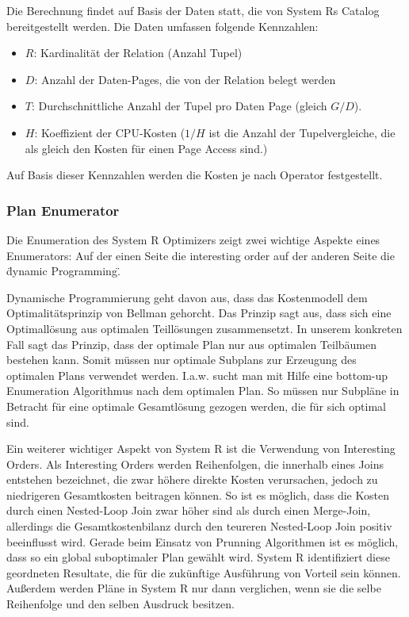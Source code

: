 Die Berechnung findet auf Basis der Daten statt, die von System Rs Catalog bereitgestellt werden. Die Daten umfassen folgende Kennzahlen:

\begin{itemize}
\item $R$: Kardinalität der Relation (Anzahl Tupel)
\item $D$: Anzahl der Daten-Pages, die von der Relation belegt werden
\item $T$: Durchschnittliche Anzahl der Tupel pro Daten Page (gleich $G/D$).
\item $H$: Koeffizient der CPU-Kosten ($1/H$ ist die Anzahl der Tupelvergleiche, die  als gleich den Kosten für einen Page Access sind.)
\end{itemize}

Auf Basis dieser Kennzahlen werden die Kosten je nach Operator festgestellt. 




\subsubsection{Plan Enumerator}
Die Enumeration des System R Optimizers zeigt zwei wichtige Aspekte eines Enumerators: Auf der einen Seite die    interesting order  auf der anderen Seite  die \"dynamic Programming\". 

Dynamische Programmierung geht davon aus, dass das Kostenmodell dem Optimalitätsprinzip von Bellman \cite{Bellman:1957} gehorcht. Das Prinzip sagt aus, dass sich eine Optimallösung aus optimalen Teillösungen zusammensetzt. In unserem konkreten Fall sagt das Prinzip, dass der optimale Plan nur aus optimalen Teilbäumen bestehen kann. Somit müssen nur optimale Subplans zur Erzeugung des optimalen Plans verwendet werden. I.a.w. sucht man mit Hilfe eine bottom-up Enumeration Algorithmus nach dem optimalen Plan. So müssen nur Subpläne in Betracht für eine optimale Gesamtlösung gezogen werden, die für sich optimal sind.



Ein weiterer wichtiger Aspekt von System R ist die Verwendung von Interesting Orders. Als Interesting Orders werden Reihenfolgen, die innerhalb eines Joins entstehen bezeichnet, die zwar höhere direkte Kosten verursachen, jedoch zu niedrigeren Gesamtkosten beitragen können. So ist es möglich, dass die Kosten durch einen Nested-Loop Join zwar höher sind als durch einen Merge-Join, allerdings die Gesamtkostenbilanz durch den teureren Nested-Loop Join positiv beeinflusst wird. Gerade beim Einsatz von Prunning Algorithmen ist es möglich, dass so ein global suboptimaler Plan gewählt wird. System R identifiziert diese geordneten Resultate, die für die zukünftige Ausführung von Vorteil sein können. Außerdem werden Pläne in System R nur dann verglichen, wenn sie die selbe Reihenfolge und den selben Ausdruck besitzen. 